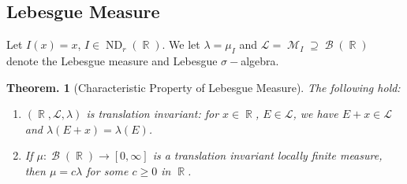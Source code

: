 \documentclass[11pt, a4paper]{memoir}
\DeclareMathOperator{\R}{{\mathbb{R}}}
\theoremstyle{change}
\newtheorem{theorem}{Theorem.}[section]
\theoremstyle{plain}
\theoremstyle{nonumberplain}
\DeclareMathOperator{\M}{{\mathcal{M}}}
\DeclareMathOperator{\B}{{\mathcal{B}}}
\DeclareMathOperator{\ND}{ND}
\numberwithin{equation}{section}
\begin{document}
\subsection{Lebesgue Measure}
Let $I(x)=x$, $I\in\ND_r(\R)$.
We let $\lambda=\mu_I$ and $\mathcal{L}=\M_I\supseteq\B(\R)$ denote the Lebesgue measure and Lebesgue $\sigma-$algebra.
\begin{theorem}[Characteristic Property of Lebesgue Measure]
    The following hold:
    \begin{enumerate}[nl,r]
        \item $(\R,\mathcal{L},\lambda)$ is translation invariant: for $x\in\R$, $E\in\mathcal{L}$, we have $E+x\in\mathcal{L}$ and $\lambda(E+x)=\lambda(E)$.
        \item If $\mu:\B(\R)\to[0,\infty]$ is a translation invariant locally finite measure, then $\mu=c\lambda$ for some $c\geq 0$ in $\R$.
    \end{enumerate}
\end{theorem}
\end{document}
